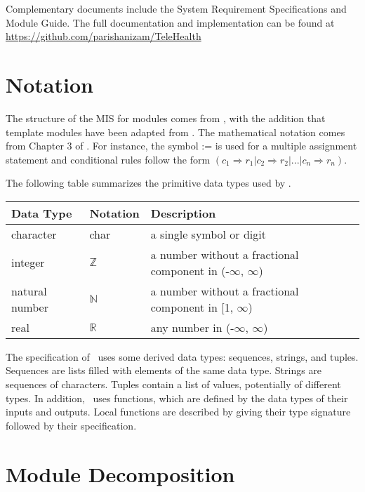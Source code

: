\documentclass[12pt, titlepage]{article}
\begin{document}
Complementary documents include the System Requirement Specifications
and Module Guide.  The full documentation and implementation can be
found at \url{https://github.com/parishanizam/TeleHealth} 

\section{Notation}

The structure of the MIS for modules comes from \citet{HoffmanAndStrooper1995},
with the addition that template modules have been adapted from
\cite{GhezziEtAl2003}.  The mathematical notation comes from Chapter 3 of
\citet{HoffmanAndStrooper1995}.  For instance, the symbol := is used for a
multiple assignment statement and conditional rules follow the form $(c_1
\Rightarrow r_1 | c_2 \Rightarrow r_2 | ... | c_n \Rightarrow r_n )$.

The following table summarizes the primitive data types used by \progname. 

\begin{center}
\renewcommand{\arraystretch}{1.2}
\noindent 
\begin{tabular}{l l p{7.5cm}} 
\toprule 
\textbf{Data Type} & \textbf{Notation} & \textbf{Description}\\ 
\midrule
character & char & a single symbol or digit\\
integer & $\mathbb{Z}$ & a number without a fractional component in (-$\infty$, $\infty$) \\
natural number & $\mathbb{N}$ & a number without a fractional component in [1, $\infty$) \\
real & $\mathbb{R}$ & any number in (-$\infty$, $\infty$)\\
\bottomrule
\end{tabular} 
\end{center}

\noindent
The specification of \progname \ uses some derived data types: sequences, strings, and
tuples. Sequences are lists filled with elements of the same data type. Strings
are sequences of characters. Tuples contain a list of values, potentially of
different types. In addition, \progname \ uses functions, which
are defined by the data types of their inputs and outputs. Local functions are
described by giving their type signature followed by their specification.

\newpage

\section{Module Decomposition}
\end{document}
